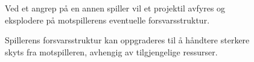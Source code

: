 \begin{figure}
\centering\setlength\fboxsep{0.2pt}
\setlength\fboxrule{0.7pt}
\caption{Ved et angrep på en annen spiller vil et projektil avfyres og eksplodere på motspillerens eventuelle forsvarsstruktur.}
\label{fig:Eksplosjon}
\end{figure}

\begin{figure}
\centering
\setlength\fboxsep{0.2pt}
\setlength\fboxrule{0.7pt}
\caption{Spillerens forsvarsstruktur kan oppgraderes til å håndtere sterkere skyts fra motspilleren, avhengig av tilgjengelige ressurser.}
\label{fig:OppgradereMur}
\end{figure}

